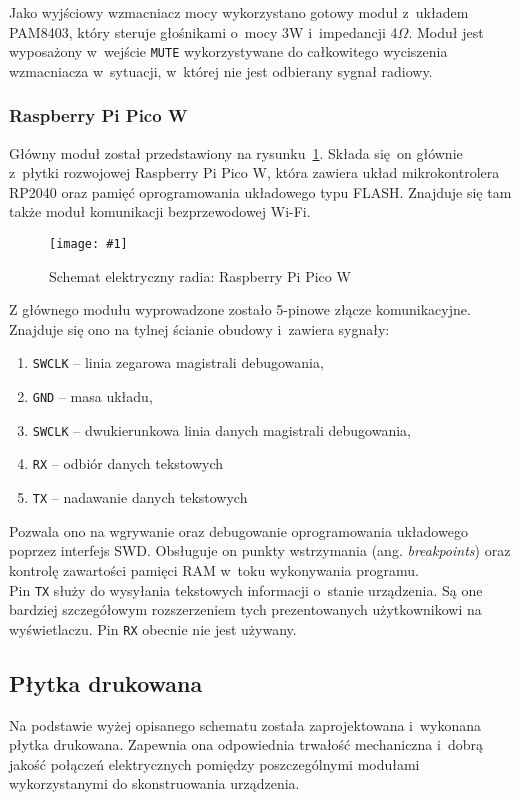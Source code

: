 \documentclass[polish]{aghengthesis}
\newcommand{\imgint}[4]{
	\begin{figure}[{#4}]
		\centering
		\texttt{[image: \#1]}
		\caption{#2}
		\label{#1}
	\end{figure}
}
\newcommand{\imgh}[3]{\imgint{#1}{#2}{#3}{H}}
\begin{document}
				Jako wyjściowy wzmacniacz mocy wykorzystano gotowy moduł z~układem PAM8403\textsuperscript{\cite{hw_amp}}, który steruje głośnikami o~mocy 3W i~impedancji 4$\Omega$. Moduł jest wyposażony w~wejście \lstinline|MUTE| wykorzystywane do całkowitego wyciszenia wzmacniacza w~sytuacji, w~której nie jest odbierany sygnał radiowy.
				
							
			\subsubsection{Raspberry Pi Pico W}
				Główny moduł został przedstawiony na rysunku~\ref{3/hw_kicad_sch_picow}.
			 	Składa się on głównie z~płytki rozwojowej Raspberry Pi Pico W, która zawiera układ mikrokontrolera RP2040 oraz pamięć oprogramowania układowego typu FLASH. Znajduje się tam także moduł komunikacji bezprzewodowej Wi-Fi.
				\imgh{3/hw_kicad_sch_picow}{Schemat elektryczny radia: Raspberry Pi Pico W}{0.65}
				
				Z głównego modułu wyprowadzone zostało 5-pinowe złącze komunikacyjne. Znajduje się ono na tylnej ścianie obudowy i~zawiera sygnały:
				\begin{enumerate}
					\setlength{\itemsep}{0cm}
					\item \lstinline|SWCLK| -- linia zegarowa magistrali debugowania,
					\item \lstinline|GND| -- masa układu,
					\item \lstinline|SWCLK| -- dwukierunkowa linia danych magistrali debugowania,
					\item \lstinline|RX| -- odbiór danych tekstowych
					\item \lstinline|TX| -- nadawanie danych tekstowych
				\end{enumerate}
				
				Pozwala ono na wgrywanie oraz debugowanie oprogramowania układowego poprzez interfejs SWD\textsuperscript{\cite{swd}}. Obsługuje on punkty wstrzymania (ang. \textit{breakpoints}) oraz kontrolę zawartości pamięci RAM w~toku wykonywania programu.
				$ $\\
				
				Pin \lstinline|TX| służy do wysyłania tekstowych informacji o~stanie urządzenia. Są one bardziej szczegółowym rozszerzeniem tych prezentowanych użytkownikowi na wyświetlaczu. Pin \lstinline|RX| obecnie nie jest używany.
				
		\subsection{Płytka drukowana}
			Na podstawie wyżej opisanego schematu została zaprojektowana i~wykonana płytka drukowana.
			Zapewnia ona odpowiednia trwałość mechaniczna i~dobrą jakość połączeń elektrycznych pomiędzy poszczególnymi modułami wykorzystanymi do skonstruowania urządzenia.
			$ $\\
			
\end{document}
